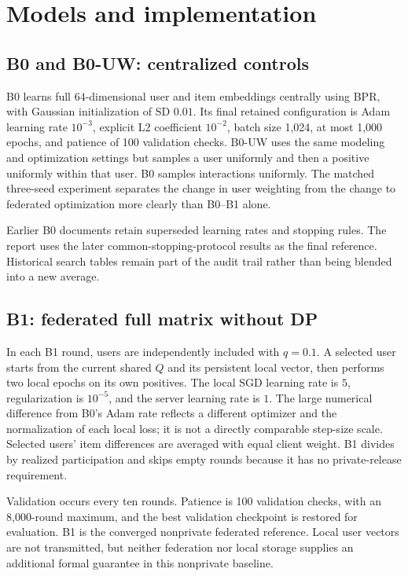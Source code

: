 \section{Models and implementation}
\label{sec:methods}
\subsection{B0 and B0-UW: centralized controls}
B0 learns full $64$-dimensional user and item embeddings centrally using BPR,
with Gaussian initialization of SD $0.01$. Its final retained configuration is
Adam learning rate $10^{-3}$, explicit L2 coefficient $10^{-2}$, batch size
1,024, at most 1,000 epochs, and patience of 100 validation checks. B0-UW uses
the same modeling and optimization settings but samples a user uniformly and
then a positive uniformly within that user. B0 samples interactions uniformly.
The matched three-seed experiment separates the change in user weighting from
the change to federated optimization more clearly than B0--B1 alone.

Earlier B0 documents retain superseded learning rates and stopping rules.
The report uses the later common-stopping-protocol results as the final
reference. Historical search tables remain part of the audit trail rather
than being blended into a new average.

\subsection{B1: federated full matrix without DP}
In each B1 round, users are independently included with $q=0.1$. A selected
user starts from the current shared $Q$ and its persistent local vector,
then performs two local epochs on its own positives. The local SGD learning
rate is $5$, regularization is $10^{-5}$, and the server learning rate is $1$.
The large numerical difference from B0's Adam rate reflects a different
optimizer and the normalization of each local loss; it is not a directly
comparable step-size scale. Selected users' item differences are averaged
with equal client weight. B1 divides by realized participation and skips
empty rounds because it has no private-release requirement.

Validation occurs every ten rounds. Patience is 100 validation checks, with
an 8,000-round maximum, and the best validation checkpoint is restored for
evaluation. B1 is the converged nonprivate federated reference. Local user
vectors are not transmitted, but neither federation nor local storage supplies
an additional formal guarantee in this nonprivate baseline.

